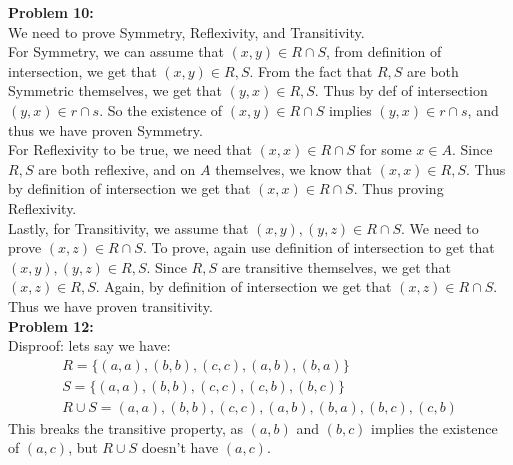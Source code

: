\documentclass[12pt]{article}
\begin{document}
\noindent
\textbf{Problem 10: }\\
We need to prove Symmetry, Reflexivity, and Transitivity. \\
For Symmetry, we can assume that $(x,y) \in R \cap S$, from definition of intersection,
we get that $(x,y) \in R, S$. From the fact that $R,S$ are both Symmetric themselves, 
we get that $(y,x) \in R, S$. Thus by def of intersection $(y,x) \in r \cap s$. So the
existence of  $(x,y) \in R \cap S$ implies $(y,x) \in r \cap s$, and thus we have 
proven Symmetry. \\
For Reflexivity to be true, we need that $(x,x) \in R \cap S$ for some $x \in A$. 
Since $R, S$ are both reflexive, and on $A$ themselves, we know 
that $(x,x) \in R, S$. Thus by definition of intersection we get that 
$(x,x) \in R \cap S$. Thus proving Reflexivity. \\
Lastly, for Transitivity, we assume that $(x,y), (y,z) \in R \cap S$. We need to prove
$(x,z) \in R \cap S$. To prove, again use definition of intersection to get that 
$(x,y), (y,z) \in R, S$. Since $R,S$ are transitive themselves, we get that 
$(x,z) \in R,S$. Again, by definition of intersection we get that $(x,z) \in R \cap S$.
Thus we have proven transitivity. \\

\noindent
\textbf{Problem 12: }\\
Disproof: lets say we have:
 \begin{align}
	 R = \{(a,a),(b,b),(c,c),(a,b),(b,a)\} \\
	 S = \{(a,a),(b,b),(c,c),(c,b),(b,c)\} \\
	 R \cup S = {(a,a),(b,b),(c,c),(a,b),(b,a),(b,c),(c,b)}
\end{align}
This breaks the transitive property, as $(a,b)$ and $(b,c)$ implies the existence of 
$(a,c)$, but  $R\cup S$ doesn't have $(a,c)$.
\end{document}
